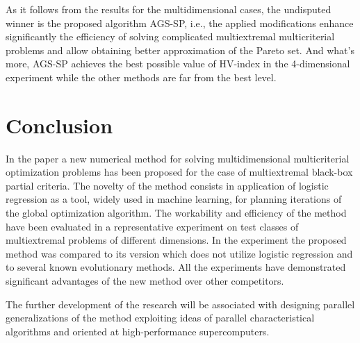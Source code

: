 \documentclass[runningheads]{llncs}
\begin{document}
As it follows from the results for the multidimensional cases, the undisputed winner is the proposed algorithm AGS-SP, i.e., the applied modifications enhance significantly the efficiency of solving complicated multiextremal multicriterial problems and allow obtaining better approximation of the Pareto set. And what's more, AGS-SP achieves the best possible value of HV-index in the 4-dimensional experiment while the other methods are far from the best level.


\section{Conclusion}\label{sec:5}

In the paper a new numerical method for solving multidimensional multicriterial  optimization problems has been proposed for the case of multiextremal black-box partial criteria. The novelty of the method consists in application of logistic regression as a tool, widely used in machine learning, for planning iterations of the global optimization algorithm. The workability and efficiency of the method have been evaluated in a representative experiment on test classes of multiextremal problems of different dimensions. In the experiment the proposed method was compared to its version which does not utilize logistic regression and to several known evolutionary methods. All the experiments have demonstrated significant advantages of the new method over other competitors.

The further development of the research will be associated with designing parallel generalizations of the method exploiting ideas of parallel characteristical algorithms and oriented at high-performance  supercomputers.


%
%
%
% 
% 
%








\end{document}
